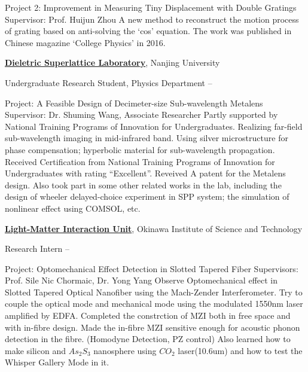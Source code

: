 \documentclass[letterpaper,MMMyyyy,nonstop]{simpleresumecv}
\begin{document}
\begin{body}
\GapNoBreak
\begin{detail}
\SubBulletItem
Project 2: Improvement in Measuring Tiny Displacement with Double Gratings
\SubBulletItem
Supervisor: 
Prof. Huijun Zhou
\SubBulletItem
A new method to reconstruct the motion process of grating based on anti-solving the ‘cos’ equation. The work was published in Chinese magazine ‘College Physics’ in 2016.
\end{detail}

\Gap

\href{http://slab.nju.edu.cn/}
{\textbf{Dieletric Superlattice Laboratory}},
Nanjing University

\GapNoBreak
\BulletItem
Undergraduate Research Student, Physics Department
\hfill
{} --
\begin{detail}
\SubBulletItem
Project: A Feasible Design of Decimeter-size Sub-wavelength Metalens
\SubBulletItem
Supervisor: 
Dr. Shuming Wang, Associate Researcher
\SubBulletItem
Partly supported by National Training Programs of Innovation for Undergraduates.
\SubBulletItem
Realizing far-field sub-wavelength imaging in mid-infrared band. Using silver microstructure for phase compensation; hyperbolic material for sub-wavelength propagation.
\SubBulletItem
Received Certification from National Training Programs of Innovation for Undergraduates with rating ``Excellent''. Reveived A patent for the Metalens design.
\SubBulletItem
Also took part in some other related works in the lab, including the design of wheeler delayed-choice experiment in SPP system; the simulation of nonlinear effect using COMSOL, etc.
\end{detail}

\Gap

\href{https://groups.oist.jp/light}
{\textbf{Light-Matter Interaction Unit}},
Okinawa Institute of Science and Technology

\GapNoBreak
\BulletItem
Research Intern
\hfill
{} --
\begin{detail}
\SubBulletItem
Project: Optomechanical Effect Detection in Slotted Tapered Fiber
\SubBulletItem
Supervisors:
Prof. Sile Nic Chormaic, Dr. Yong Yang
\SubBulletItem
Observe Optomechanical effect in Slotted Tapered Optical Nanofiber using the Mach-Zender Interferometer. Try to couple the optical mode and mechanical mode using the modulated 1550nm laser amplified by EDFA.
\SubBulletItem
Completed the constrction of MZI both in free space and with in-fibre design. Made the in-fibre MZI sensitive enough for acoustic phonon detection in the fibre. (Homodyne Detection, PZ control)
\SubBulletItem
Also learned how to make silicon and $As_2S_3$ nanosphere using $CO_2$ laser(10.6um) and how to test the Whisper Gallery Mode in it.
\end{detail}


\end{body}
\end{document}
